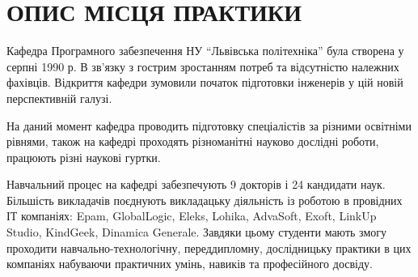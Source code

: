 \section{ОПИС МІСЦЯ ПРАКТИКИ}


Кафедра Програмного забезпечення НУ “Львівська політехніка” була створена у серпні 1990 р. В зв’язку з гострим зростанням потреб та відсутністю належних фахівців. Відкриття кафедри зумовили початок підготовки інженерів у цій новій перспективній галузі.

На даний момент кафедра проводить підготовку спеціалістів за різними освітніми рівнями, також на кафедрі проходять різноманітні науково дослідні роботи, працюють різні наукові гуртки.

Навчальний процес на кафедрі забезпечують 9 докторів і 24 кандидати наук. Більшість викладачів поєднують викладацьку діяльність із роботою в провідних ІТ компаніях: Epam, GlobalLogic, Eleks, Lohika, AdvaSoft, Exoft, LinkUp Studio, KindGeek, Dinamica Generale. Завдяки цьому студенти мають змогу проходити навчально-технологічну, переддипломну, дослідницьку практики в цих компаніях набуваючи практичних умінь, навиків та професійного досвіду.
